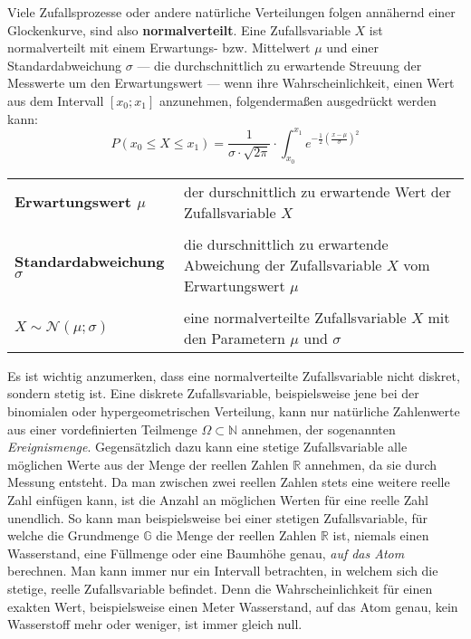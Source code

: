 



\thispagestyle{plain}


Viele Zufallsprozesse oder andere nat\"{u}rliche Verteilungen folgen ann\"{a}hernd einer Glockenkurve, sind also \textbf{normalverteilt}. Eine Zufallsvariable $X$ ist normalverteilt mit einem Erwartungs- bzw. Mittelwert $\mu$ und einer Standardabweichung $\sigma$ --- die durchschnittlich zu erwartende Streuung der Messwerte um den Erwartungswert --- wenn ihre Wahrscheinlichkeit, einen Wert aus dem Intervall $[x_{0} ; x_{1}]$ anzunehmen, folgenderma\ss{}en ausgedr\"{u}ckt werden kann: $$P(x_{0} \leq X \leq x_{1}) = \frac{1}{\sigma \cdot \sqrt{2\pi}} \cdot \int_{x_0}^{x_1} e^{-\frac{1}{2}\left(\frac{x - \mu}{\sigma}\right)^2}$$

\begin{tabular}{l p{11cm}}
	\textbf{Erwartungswert $\mu$} &  der durschnittlich zu erwartende Wert der Zufallsvariable $X$
	\\ & \\
	\textbf{Standardabweichung $\sigma$} &  die durschnittlich zu erwartende Abweichung der Zufallsvariable $X$ vom Erwartungswert $\mu$
	\\ & \\
	\textbf{$X \sim \mathcal{N}(\mu; \sigma)$} &  eine normalverteilte Zufallsvariable $X$ mit den Parametern $\mu$ und $\sigma$
\end{tabular}

Es ist wichtig anzumerken, dass eine normalverteilte Zufallsvariable nicht diskret, sondern stetig ist. Eine diskrete Zufallsvariable, beispielsweise jene bei der binomialen oder hypergeometrischen Verteilung, kann nur nat\"{u}rliche Zahlenwerte aus einer vordefinierten Teilmenge $\Omega \subset \mathbb{N}$ annehmen, der sogenannten \emph{Ereignismenge}. Gegens\"{a}tzlich dazu kann eine stetige Zufallsvariable alle m\"{o}glichen Werte aus der Menge der reellen Zahlen $\mathbb{R}$ annehmen, da sie durch Messung entsteht. Da man zwischen zwei reellen Zahlen stets eine weitere reelle Zahl einf\"{u}gen kann, ist die Anzahl an m\"{o}glichen Werten f\"{u}r eine reelle Zahl unendlich. So kann man beispielsweise bei einer stetigen Zufallsvariable, f\"{u}r welche die Grundmenge $\mathbb{G}$ die Menge der reellen Zahlen $\mathbb{R}$ ist, niemals einen Wasserstand, eine F\"{u}llmenge oder eine Baumh\"{o}he genau, \emph{auf das Atom} berechnen. Man kann immer nur ein Intervall betrachten, in welchem sich die stetige, reelle Zufallsvariable befindet. Denn die Wahrscheinlichkeit f\"{u}r einen exakten Wert, beispielsweise einen Meter Wasserstand, auf das Atom genau, kein Wasserstoff mehr oder weniger, ist immer gleich null. 

